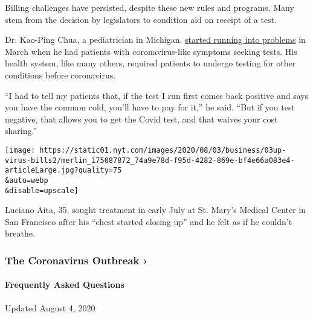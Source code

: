 Billing challenges have persisted, despite these new rules and programs.
Many stem from the decision by legislators to condition aid on receipt
of a test.

Dr. Kao-Ping Chua, a pediatrician in Michigan,
\href{https://www.healthaffairs.org/do/10.1377/hblog20200413.783118/full/}{started
running into problems} in March when he had patients with
coronavirus-like symptoms seeking tests. His health system, like many
others, required patients to undergo testing for other conditions before
coronavirus.

``I had to tell my patients that, if the test I run first comes back
positive and says you have the common cold, you'll have to pay for it,''
he said. ``But if you test negative, that allows you to get the Covid
test, and that waives your cost sharing.''

\texttt{[image: https://static01.nyt.com/images/2020/08/03/business/03up-virus-bills2/merlin\_175087872\_74a9e78d-f95d-4282-869e-bf4e66a083e4-articleLarge.jpg?quality=75\\\&auto=webp\\\&disable=upscale]}

Luciano Aita, 35, sought treatment in early July at St. Mary's Medical
Center in San Francisco after his ``chest started closing up'' and he
felt as if he couldn't breathe.

\href{https://www.nytimes.com/news-event/coronavirus?action=click\&pgtype=Article\&state=default\&region=MAIN_CONTENT_3\&context=storylines_faq}{}

\hypertarget{the-coronavirus-outbreak-}{%
\subsubsection{The Coronavirus Outbreak
›}\label{the-coronavirus-outbreak-}}

\hypertarget{frequently-asked-questions}{%
\paragraph{Frequently Asked
Questions}\label{frequently-asked-questions}}

Updated August 4, 2020

